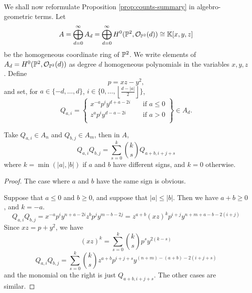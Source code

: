 \documentclass[12pt]{amsart}
\begin{document}
We shall now reformulate Proposition \ref{prop:counts-summary} in
algebro-geometric terms. Let
\begin{equation}
  \label{eq:homog-coord-ring}
  A = \bigoplus_{d=0}^\infty A_d = \bigoplus_{d=0}^\infty H^0(\mathbb{P}^2, \mathcal{O}_{\mathbb{P}^2}(d)) \cong \mathbb{K}[x,y,z]
\end{equation}
be the homogeneous coordinate ring of $\mathbb{P}^2$. We write elements of $A_d
= H^0(\mathbb{P}^2,\mathcal{O}_{\mathbb{P}^2}(d))$ as degree $d$ homogeneous polynomials in
the variables $x,y,z$. Define
\begin{equation}
  \label{eq:P}
  p = xz - y^2,
\end{equation}
and set, for $a \in \{-d,\dots,d\}$, $i \in \{0,\dots,\left\lfloor\frac{d-|a|}{2}\right\rfloor\}$,
\begin{equation}
  \label{eq:big-Q}
  Q_{a,i} = \left\{
  \begin{aligned}
    x^{-a}p^iy^{d+a-2i}& \quad \text{if } a \leq 0\\
    z^ap^iy^{d-a-2i} & \quad \text{if } a > 0\\
  \end{aligned} \right\} \in A_d.
\end{equation}
\begin{proposition}
  \label{prop:polynomial-algebra}
  Take $Q_{a,i} \in A_n$ and $Q_{b,j} \in A_m$, then in $A$,
  \begin{equation}
    \label{eq:polynomial-algebra}
    Q_{a,i}Q_{b,j} = \sum_{s=0}^{k}\binom{k}{s} Q_{a+b,i+j+s}
  \end{equation}
  where $k = \min(|a|,|b|)$ if $a$ and $b$ have different signs, and
  $k = 0$ otherwise.
\end{proposition}
\begin{proof}
  The case where $a$ and $b$ have the same sign is obvious. 

  Suppose that $a \leq 0$ and $b \geq 0$, and suppose that $|a| \leq
  |b|$. Then we have $a+b \geq 0$, and $k = -a$.
  \begin{equation}
    Q_{a,i}Q_{b,j} = x^{-a}p^iy^{n+a-2i}z^bp^jy^{m-b-2j} =
    z^{a+b}(xz)^kp^{i+j}y^{n+m+a-b-2(i+j)}
  \end{equation}
  Since $xz = p + y^2$, we have 
  \begin{equation}
    (xz)^k = \sum_{s=0}^k \binom{k}{s}p^sy^{2(k-s)}
  \end{equation}
  \begin{equation}
    Q_{a,i}Q_{b,j} = \sum_{s=0}^k
    \binom{k}{s}z^{a+b}p^{i+j+s}y^{(n+m)-(a+b)-2(i+j+s)}
  \end{equation}
  and the monomial on the right is just $Q_{a+b,i+j+s}$. The other cases are similar.
\end{proof}
\end{document}
